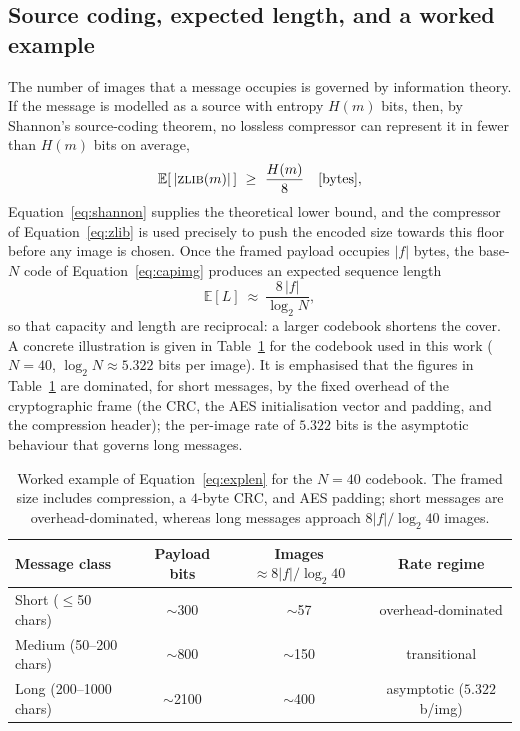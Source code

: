\documentclass[11pt]{article}
\theoremstyle{definition}
\newcommand{\Eqn}[1]{Equation~\eqref{#1}}
\newcommand{\Tab}[1]{Table~\ref{#1}}
\begin{document}
\subsection{Source coding, expected length, and a worked example}\label{sec:worked}
The number of images that a message occupies is governed by information theory. If
the message is modelled as a source with entropy $H(m)$ bits, then, by Shannon's
source-coding theorem, no lossless compressor can represent it in fewer than
$H(m)$ bits on average,
\begin{equation}
  \mathbb{E}\!\left[\,|\textsc{zlib}(m)|\,\right]\ \ge\ \frac{H(m)}{8}\quad[\mathrm{bytes}],
  \label{eq:shannon}
\end{equation}
Equation~\eqref{eq:shannon} supplies the theoretical lower bound, and the compressor
of \Eqn{eq:zlib} is used precisely to push the encoded size
towards this floor before any image is chosen. Once the framed payload occupies
$|f|$ bytes, the base-$N$ code of \Eqn{eq:capimg} produces an expected sequence
length
\begin{equation}
  \mathbb{E}[L]\ \approx\ \frac{8\,|f|}{\log_2 N},
  \label{eq:explen}
\end{equation}
so that capacity and length are reciprocal: a larger codebook shortens the cover.
A concrete illustration is given in \Tab{tab:worked} for the codebook used in this
work ($N=40$, $\log_2 N\approx 5.322$ bits per image). It is emphasised that the
figures in \Tab{tab:worked} are dominated, for short messages, by the fixed
overhead of the cryptographic frame (the CRC, the AES initialisation vector and
padding, and the compression header); the per-image rate of $5.322$ bits is the
asymptotic behaviour that governs long messages.

\begin{table}[H]
\centering
\caption{Worked example of \Eqn{eq:explen} for the $N=40$ codebook. The framed size
includes compression, a $4$-byte CRC, and AES padding; short messages are
overhead-dominated, whereas long messages approach $8|f|/\log_2 40$ images.}\label{tab:worked}
\begin{tabular}{@{}lccc@{}}
\toprule
Message class & Payload bits & Images $\approx 8|f|/\log_2 40$ & Rate regime \\
\midrule
Short ($\le$50 chars)  & $\sim$300  & $\sim$57  & overhead-dominated \\
Medium (50--200 chars) & $\sim$800  & $\sim$150 & transitional \\
Long (200--1000 chars) & $\sim$2100 & $\sim$400 & asymptotic ($5.322$ b/img) \\
\bottomrule
\end{tabular}
\end{table}
\end{document}
